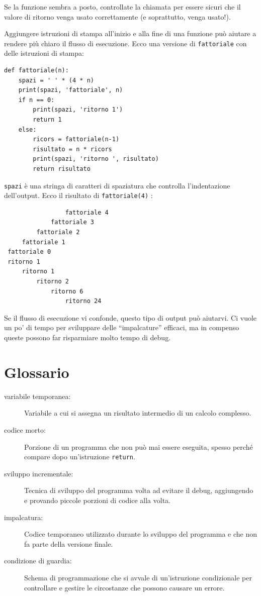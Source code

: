 \documentclass[10pt]{book}
\begin{document}
Se la funzione sembra a posto, controllate la chiamata per essere sicuri che il valore di ritorno venga usato correttamente (e soprattutto, venga usato!).

Aggiungere istruzioni di stampa all'inizio e alla fine di una funzione può aiutare a rendere più chiaro il flusso di esecuzione. Ecco una versione di {\tt fattoriale} con delle istruzioni di stampa:

\begin{verbatim}
def fattoriale(n):
    spazi = ' ' * (4 * n)
    print(spazi, 'fattoriale', n)
    if n == 0:
        print(spazi, 'ritorno 1')
        return 1
    else:
        ricors = fattoriale(n-1)
        risultato = n * ricors
        print(spazi, 'ritorno ', risultato)
        return risultato
\end{verbatim}
%
{\tt spazi} è una stringa di caratteri di spaziatura che controlla l'indentazione dell'output. Ecco il risultato di {\tt fattoriale(4)} :

\begin{verbatim}
                 fattoriale 4
             fattoriale 3
         fattoriale 2
     fattoriale 1
 fattoriale 0
 ritorno 1
     ritorno 1
         ritorno 2
             ritorno 6
                 ritorno 24
\end{verbatim}
%
Se il flusso di esecuzione vi confonde, questo tipo di output può aiutarvi. Ci vuole un po' di tempo per sviluppare delle ``impalcature'' efficaci, ma in compenso queste possono far risparmiare molto tempo di debug.


\section{Glossario}

\begin{description}

\item[variabile temporanea:]  Variabile a cui si assegna un risultato intermedio di un calcolo complesso.

\item[codice morto:]  Porzione di un programma che non può mai essere eseguita, spesso perché compare dopo un'istruzione {\tt return}.

\item[sviluppo incrementale:]  Tecnica di sviluppo del programma volta ad evitare il debug, aggiungendo e provando piccole porzioni di codice alla volta.

\item[impalcatura:]  Codice temporaneo utilizzato durante lo sviluppo del programma e che non fa parte della versione finale.

\item[condizione di guardia:]  Schema di programmazione che si avvale di un'istruzione condizionale per controllare e gestire le circostanze che possono causare un errore.

\end{description}
\end{document}
